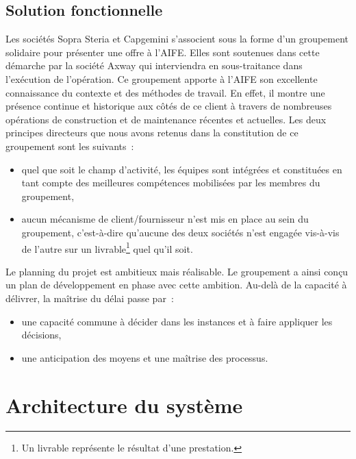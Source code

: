 \documentclass[12pt,a4paper]{article}
\begin{document}
\subsection{Solution fonctionnelle}
Les sociétés Sopra Steria et Capgemini s’associent sous la forme d’un groupement solidaire pour présenter une offre à l’\gls{AIFE}. Elles sont soutenues dans cette démarche par la société Axway qui interviendra en sous-traitance dans l’exécution de l’opération.
\smallbreak
Ce groupement apporte à l’\gls{AIFE} son excellente connaissance du contexte et des méthodes de travail. En effet, il montre une présence continue et historique aux côtés de ce client à travers de nombreuses opérations de construction et de maintenance récentes et actuelles.
\smallbreak
Les deux principes directeurs que nous avons retenus dans la constitution de ce groupement sont les suivants~:
\smallbreak
\begin{itemize}
\item quel que soit le champ d’activité, les équipes sont intégrées et constituées en tant compte des meilleures compétences mobilisées par les membres du groupement,
\item aucun mécanisme de client/fournisseur n’est mis en place au sein du groupement, c’est-à-dire qu’aucune des deux sociétés n’est engagée vis-à-vis de l’autre sur un livrable\footnote{Un livrable représente le résultat d'une prestation.} quel qu’il soit.
\end{itemize}
\medbreak
Le planning du projet est ambitieux mais réalisable. Le groupement a ainsi conçu un plan de développement en phase avec cette ambition. Au-delà de la capacité à délivrer, la maîtrise du délai passe par~:
\smallbreak
\begin{itemize}
\item une capacité commune à décider dans les instances et à faire appliquer les décisions,
\item une anticipation des moyens et une maîtrise des processus.
\end{itemize}
\smallbreak
\newpage
\clearpage
\section{Architecture du système}
\end{document}
